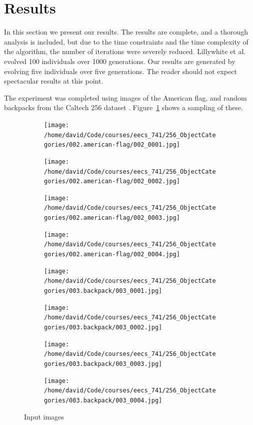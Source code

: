 \documentclass[conference]{IEEEtran}
\begin{document}
\section{Results}
In this section we present our results. The results are complete, and a thorough analysis is included, but due to the time constraints and the time complexity of the algorithm, the number of iterations were severely reduced. Lillywhite et al. evolved 100 individuals over 1000 generations. Our results are generated by evolving five individuals over five generations. The reader should not expect spectacular results at this point.

The experiment was completed using images of the American flag, and random backpacks from the Caltech 256 dataset \cite{griffin2007caltech}. Figure~\ref{fig:images} shows a sampling of these.
\begin{figure}[t]
  \centering
  \begin{subfigure}{.2\textwidth}
    \centering
    \texttt{[image: /home/david/Code/courses/eecs\_741/256\_ObjectCategories/002.american-flag/002\_0001.jpg]}
  \end{subfigure}
  \begin{subfigure}{.2\textwidth}
    \centering
    \texttt{[image: /home/david/Code/courses/eecs\_741/256\_ObjectCategories/002.american-flag/002\_0002.jpg]}
  \end{subfigure}
  \begin{subfigure}{.2\textwidth}
    \centering
    \texttt{[image: /home/david/Code/courses/eecs\_741/256\_ObjectCategories/002.american-flag/002\_0003.jpg]}
  \end{subfigure}
  \begin{subfigure}{.2\textwidth}
    \centering
    \texttt{[image: /home/david/Code/courses/eecs\_741/256\_ObjectCategories/002.american-flag/002\_0004.jpg]}
  \end{subfigure}
  \begin{subfigure}{.2\textwidth}
    \centering
    \texttt{[image: /home/david/Code/courses/eecs\_741/256\_ObjectCategories/003.backpack/003\_0001.jpg]}
  \end{subfigure}
  \begin{subfigure}{.2\textwidth}
    \centering
    \texttt{[image: /home/david/Code/courses/eecs\_741/256\_ObjectCategories/003.backpack/003\_0002.jpg]}
  \end{subfigure}
  \begin{subfigure}{.2\textwidth}
    \centering
    \texttt{[image: /home/david/Code/courses/eecs\_741/256\_ObjectCategories/003.backpack/003\_0003.jpg]}
  \end{subfigure}
  \begin{subfigure}{.2\textwidth}
    \centering
    \texttt{[image: /home/david/Code/courses/eecs\_741/256\_ObjectCategories/003.backpack/003\_0004.jpg]}
  \end{subfigure}
  \caption{Input images}
  \label{fig:images}
\end{figure}
\end{document}
